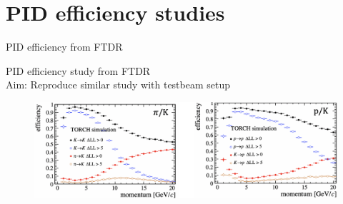 \documentclass{beamer}
\begin{document}
\section{PID efficiency studies}
\begin{frame}{PID efficiency from FTDR}
  \begin{center}
    PID efficiency study from FTDR \\
    Aim: Reproduce similar study with testbeam setup
  \end{center}
  \begin{figure}
    \includegraphics[width = 1.0\textwidth]{Plots/PIDEfficiencyFTDR.png}
  \end{figure}
\end{frame}
\end{document}
